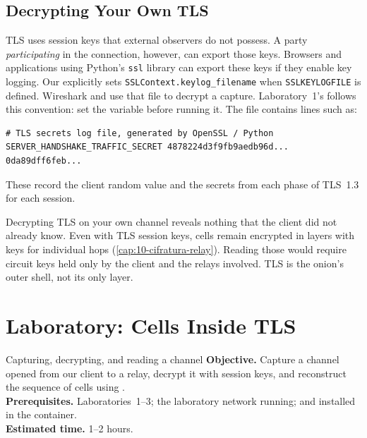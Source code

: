 \subsection{Decrypting Your Own TLS}

TLS uses session keys that external observers do not possess. A party \emph{participating} in the connection, however, can export those keys. Browsers and applications using Python's \texttt{ssl} library can export these keys if they enable key logging. Our  explicitly sets \texttt{SSLContext.keylog\_filename} when \texttt{SSLKEYLOGFILE} is defined. Wireshark and  use that file to decrypt a capture. Laboratory~1's  follows this convention: set the variable before running it. The file contains lines such as:
\begin{lstlisting}[numbers=none]
# TLS secrets log file, generated by OpenSSL / Python
SERVER_HANDSHAKE_TRAFFIC_SECRET 4878224d3f9fb9aedb96d... 0da89dff6feb...
\end{lstlisting}
These record the client random value and the secrets from each phase of TLS~1.3 for each session.

\begin{approfondimento}
Decrypting TLS on your own channel reveals nothing that the client did not already know. Even with TLS session keys,  cells remain encrypted in layers with keys for individual hops (\cref{cap:10-cifratura-relay}). Reading those would require circuit keys held only by the client and the relays involved. TLS is the onion's outer shell, not its only layer.
\end{approfondimento}

\section{Laboratory: Cells Inside TLS}\label{sec:lab-traffico}

\begin{laboratorio}[12]{Capturing, decrypting, and reading a channel}
\textbf{Objective.} Capture a channel opened from our client to a relay, decrypt it with session keys, and reconstruct the sequence of cells using .\\
\textbf{Prerequisites.} Laboratories~1--3; the laboratory network running;  and  installed in the container.\\
\textbf{Estimated time.} 1--2 hours.
\end{laboratorio}

